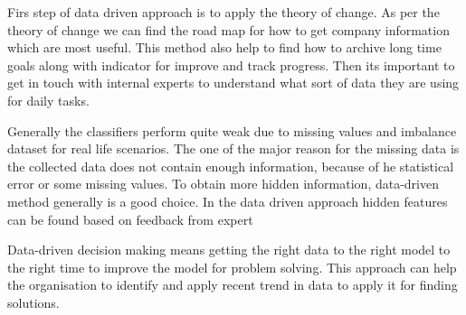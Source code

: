 Firs step of data driven approach is to apply the theory of change. As per the theory of change we can find the road map for how to get company information which are most useful. This method also help to find how to archive long time goals along with indicator for improve and track progress. Then its important to get in touch with internal experts to understand what sort of data they are using for daily tasks.

Generally the classifiers perform quite weak due to missing values and imbalance dataset for real life scenarios. The one of the major reason for the missing data is the collected data does not contain enough information, because of he statistical error or some missing values. To obtain more hidden
information, data-driven method generally is a good choice. In the data driven approach hidden features can be found based on feedback from expert

Data-driven decision making means getting the right data to the right model to the right time to improve the model for problem solving. This approach can help the organisation to identify and apply recent trend in data to apply it for finding solutions. 


